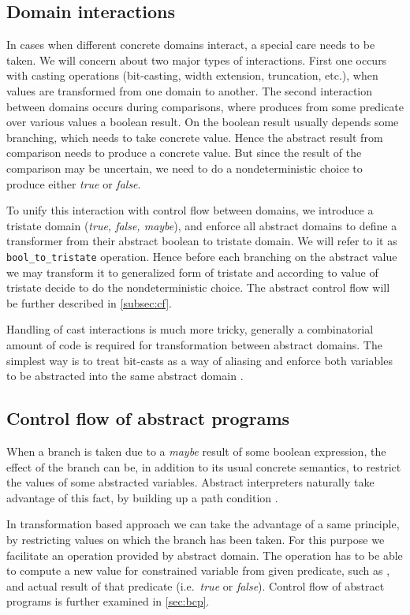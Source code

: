 \subsection{Domain interactions} \label{sec:interactions}
In cases when different concrete domains interact, a special care needs to be
taken. We will concern about two major types of interactions. First one occurs
with casting operations (bit-casting, width extension, truncation, etc.), when
values are transformed from one domain to another. The second
interaction between domains occurs during comparisons, where \LLVM produces from
some predicate over various values a boolean result. On the boolean result
usually depends some branching, which needs to take concrete value. Hence the
abstract result from comparison needs to produce a concrete value. But since the
result of the comparison may be uncertain, we need to do a nondeterministic
choice to produce either \emph{true} or \emph{false}.

To unify this interaction with control flow between domains, we introduce
a tristate domain (\emph{true, false, maybe}),
and enforce all abstract domains to define a transformer from their abstract
boolean to tristate domain. We will refer to it as \texttt{bool\_to\_tristate}
operation. Hence before each branching on the abstract value we may transform it
to generalized form of tristate and according to value of tristate decide to do
the nondeterministic choice. The abstract control flow will be further described
in \autoref{subsec:cf}.

Handling of cast interactions is much more tricky, generally a combinatorial
amount of code is required for transformation between abstract domains. The
simplest way is to treat bit-casts as a way of aliasing and enforce both
variables to be abstracted into the same abstract domain \cite{Rockai15}.


\subsection{Control flow of abstract programs} \label{subsec:cf}
When a branch is taken due to a \emph{maybe} result of some boolean expression,
the effect of the branch can be, in addition to its usual concrete semantics,
to restrict the values of some abstracted variables. Abstract interpreters
naturally take advantage of this fact, by building up a path condition
\cite{Rockai15}.

In transformation based approach we can take the advantage of a same principle, by
restricting values on which the branch has been taken. For this purpose we
facilitate an  operation provided by abstract domain. The
 operation has to be able to compute a new value for constrained
variable from given \LLVM predicate, such as , and actual result of
that predicate (i.e.~\emph{true} or \emph{false}). Control flow of abstract
programs is further examined in \autoref{sec:bcp}.


